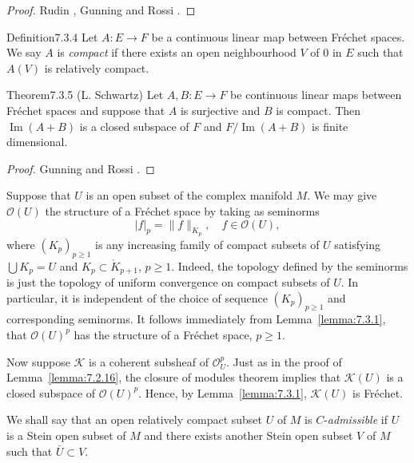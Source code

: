 \begin{proof}
Rudin \cite[Theorem 1.22]{bib:II:rudin-w:1}, Gunning and Rossi \cite[Appendix B]{bib:II:gunning-r-c-and-rossi-h:1}.
\end{proof}
\begin{originaltheorem}{Definition}{7.3.4}
Let $A:E\to F$ be a continuous linear map between Fr\'echet spaces. We say $A$ is \emph{compact} if there exists an open neighbourhood $V$ of $0$ in $E$ such that $A(V)$ is relatively compact.
\end{originaltheorem}
\begin{originaltheorem}{Theorem}{7.3.5 (L. Schwartz)}
Let $A,B:E\to F$ be continuous linear maps between Fr\'echet spaces and suppose that $A$ is surjective and $B$ is compact. Then $\operatorname{Im}(A+B)$ is a closed subspace of $F$ and $F/\operatorname{Im}(A+B)$ is finite dimensional.
\end{originaltheorem}
\begin{proof}
Gunning and Rossi \cite[Appendix B]{bib:II:gunning-r-c-and-rossi-h:1}.
\end{proof}
Suppose that $U$ is an open subset of the complex manifold $M$. We may give $\mathcal O(U)$ the structure of a Fr\'echet space by taking as seminorms
\[
|f|_p=\|f\|_{K_p},\quad f\in\mathcal O(U),
\]
where $(K_p)_{p\geq1}$ is any increasing family of compact subsets of $U$ satisfying $\bigcup K_p=U$ and $K_p\subset\mathring K_{p+1}$, $p\geq1$. Indeed, the topology defined by the seminorms is just the topology of uniform convergence on compact subsets of $U$. In particular, it is independent of the choice of sequence $(K_p)_{p\geq1}$ and corresponding seminorms. It follows immediately from Lemma~\ref{lemma:7.3.1}, that $\mathcal O(U)^p$ has the structure of a Fr\'echet space, $p\geq1$.

Now suppose $\mathcal K$ is a coherent subsheaf of $\mathcal O_U^p$. Just as in the proof of Lemma~\ref{lemma:7.2.16}, the closure of modules theorem implies that $\mathcal K(U)$ is a closed subspace of $\mathcal O(U)^p$. Hence, by Lemma~\ref{lemma:7.3.1}, $\mathcal K(U)$ is Fr\'echet.

We shall say that an open relatively compact subset $U$ of $M$ is $C$-\emph{admissible} if $U$ is a Stein open subset of $M$ and there exists another Stein open subset $V$ of $M$ such that $\bar U\subset V$.

